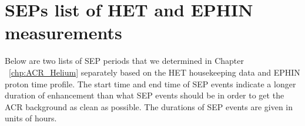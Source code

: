 \chapter{SEPs list of HET and EPHIN measurements}

Below are two lists of \ac{SEP} periods that we determined in Chapter ~\ref{chp:ACR_Helium} separately based on the \ac{HET} housekeeping data and \ac{EPHIN} proton time profile. The start time and end time of \ac{SEP} events indicate a longer duration of enhancement than what \ac{SEP} events should be in order to get the \ac{ACR} background as clean as possible. The durations of \ac{SEP} events are given in units of hours.
\label{Appendix:SEPlist}

\begin{center}
    \begin{longtable}{|c|c|c|c|}
   

\end{longtable}
\end{center}
